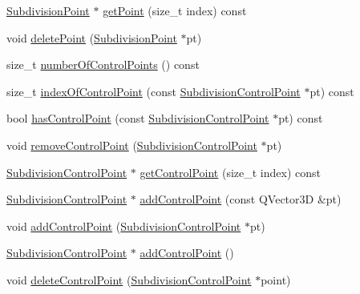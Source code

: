 \begin{DoxyCompactItemize}
\item 
\hyperlink{classShipCAD_1_1SubdivisionPoint}{Subdivision\+Point} $\ast$ \hyperlink{classShipCAD_1_1SubdivisionSurface_ad668fd27371f9967de28d38f250802c9}{get\+Point} (size\+\_\+t index) const 
\item 
void \hyperlink{classShipCAD_1_1SubdivisionSurface_a4117039bfd819cb28ab5cb04296fdcd7}{delete\+Point} (\hyperlink{classShipCAD_1_1SubdivisionPoint}{Subdivision\+Point} $\ast$pt)
\item 
size\+\_\+t \hyperlink{classShipCAD_1_1SubdivisionSurface_a994923f432129431b30d6b532059a6ab}{number\+Of\+Control\+Points} () const 
\item 
size\+\_\+t \hyperlink{classShipCAD_1_1SubdivisionSurface_a7c7e95d4d3f6c100204e37f45fca5636}{index\+Of\+Control\+Point} (const \hyperlink{classShipCAD_1_1SubdivisionControlPoint}{Subdivision\+Control\+Point} $\ast$pt) const 
\item 
bool \hyperlink{classShipCAD_1_1SubdivisionSurface_a41f7f2de3711c577b06afafc50df9903}{has\+Control\+Point} (const \hyperlink{classShipCAD_1_1SubdivisionControlPoint}{Subdivision\+Control\+Point} $\ast$pt) const 
\item 
void \hyperlink{classShipCAD_1_1SubdivisionSurface_aa20b9227481180329e03de8897c52933}{remove\+Control\+Point} (\hyperlink{classShipCAD_1_1SubdivisionControlPoint}{Subdivision\+Control\+Point} $\ast$pt)
\item 
\hyperlink{classShipCAD_1_1SubdivisionControlPoint}{Subdivision\+Control\+Point} $\ast$ \hyperlink{classShipCAD_1_1SubdivisionSurface_a534abfeaab8e30436c7ba4f14048472a}{get\+Control\+Point} (size\+\_\+t index) const 
\item 
\hyperlink{classShipCAD_1_1SubdivisionControlPoint}{Subdivision\+Control\+Point} $\ast$ \hyperlink{classShipCAD_1_1SubdivisionSurface_af644edd0d4ba993dbab280f036b37171}{add\+Control\+Point} (const Q\+Vector3D \&pt)
\item 
void \hyperlink{classShipCAD_1_1SubdivisionSurface_a7ac8b717bcb728da2334cc2f16c8b428}{add\+Control\+Point} (\hyperlink{classShipCAD_1_1SubdivisionControlPoint}{Subdivision\+Control\+Point} $\ast$pt)
\item 
\hyperlink{classShipCAD_1_1SubdivisionControlPoint}{Subdivision\+Control\+Point} $\ast$ \hyperlink{classShipCAD_1_1SubdivisionSurface_a7eccf33cb39ef12f56553352da34da62}{add\+Control\+Point} ()
\item 
void \hyperlink{classShipCAD_1_1SubdivisionSurface_ad4f874132a137e89a39e60572748dab0}{delete\+Control\+Point} (\hyperlink{classShipCAD_1_1SubdivisionControlPoint}{Subdivision\+Control\+Point} $\ast$point)

\end{DoxyCompactItemize}
